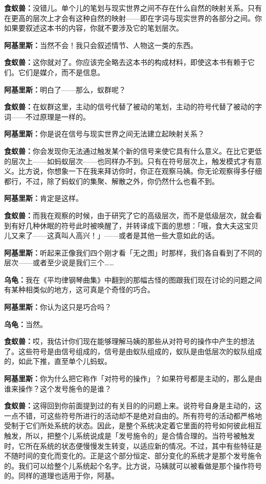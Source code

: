 \documentclass[
  12pt,
  twoside,
  openright,
  oldfontcommands,
]{memoir}
\newcommand{\dialogname}[1]{{\heifamily\bfseries #1}}
\begin{document}
\dialogname{食蚁兽：}没错儿。单个儿的笔划与现实世界之间不存在什么自然的映射关系。只有在更高的层次上才会有这种自然的映射------即在字词与现实世界的各部分之间。你如果要叙述这本书的内容，你就不要涉及它的笔划层次。

\dialogname{阿基里斯：}当然不会！我只会叙述情节、人物这一类的东西。

\dialogname{食蚁兽：}这你就对了。你应该完全略去这本书的构成材料，即使这本书有赖于它们。它们是媒介，而不是信息。

\dialogname{阿基里斯：}明白了------那么，蚁群呢？

\dialogname{食蚁兽：}在蚁群这里，主动的信号代替了被动的笔划，主动的符号代替了被动的字词------不过原理是一样的。

\dialogname{阿基里斯：}你是说在信号与现实世界之间无法建立起映射关系？

\dialogname{食蚁兽：}你会发现你无法通过触发某个新的信号来使它具有什么意义。在比它更低的层次上------如蚂蚁层次------也同样办不到。只有在符号层次上，触发模式才有意义。比方说，你想象一下在我来拜访你时，你正在观察马姨。你无论观察得多仔细都行，不过，除了蚂蚁们的集聚、解散之外，你仍然什么也看不到。

\dialogname{阿基里斯：}肯定是这样。

\dialogname{食蚁兽：}而我在观察的时候，由于研究了它的高级层次，而不是低级层次，就会看到有好几种休眠的符号此时被唤醒了，并转译成下面的思想：「哦，食大夫这宝贝儿又来了------这真叫人高兴！」------或者是其他一些大意如此的话。

\dialogname{阿基里斯：}听起来正像我们四个刚才看「无之图」时那样，我们各自看到了不同的层次------或者至少说是我们三个\ldots\ldots{}

\dialogname{乌龟：}我在《平均律钢琴曲集》中翻到的那幅古怪的图跟我们现在讨论的问题之间有某种相类似的地方，这可真是个奇怪的巧合。

\dialogname{阿基里斯：}你认为这只是巧合吗？

\dialogname{乌龟：}当然。

\dialogname{食蚁兽：}哎，我估计你们现在能够理解马姨的那些从对符号的操作中产生的想法了。这些符号是由信号组成的，信号是由蚁队组成的，蚁队是由低层次的蚁队组成的，如此下推，直至单个儿蚂蚁。

\dialogname{阿基里斯：}你为什么把它称作「对符号的操作」？如果符号都是主动的，那么是由谁来操作？这个发号施令的是谁？

\dialogname{食蚁兽：}这得回到你前面提到过的有关目的的问题上来。说符号自身是主动的，这一点不错，可这些符号所进行的活动却不是绝对自由的。所有符号的活动都严格地受制于它们所处系统的状态。因此，是整个系统决定着它里面的符号如何彼此相互触发，所以，把整个儿系统说成是「发号施令的」是合情合理的。当符号被触发时，它所在系统的状态便慢慢发生转变，以适应新的情况。不过，其中有些特征是不随时间的变化而变化的。正是这个部分恒定、部分变化的系统才是那个发号施令的。我们可以给整个儿系统起个名字。比方说，马姨就可以被看做是那个操作符号的。同样的道理也适用于你，阿基。
\end{document}
